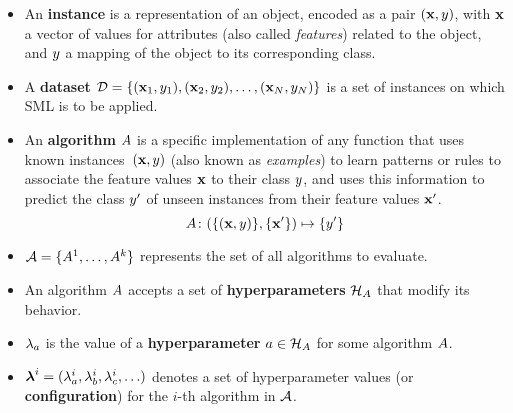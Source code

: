 	\begin{itemize}
		\item
		An {\bf instance} is a representation of an object, encoded as a pair $(\mathbf{x}, y)$,
		with $\mathbf{x}$ a vector of values for attributes (also called \emph{features}) related to
		the object, and $y$ a mapping of the object to its corresponding class.
		
		\item
		A {\bf dataset} $\mathcal{D} = \{(\mathbf{x}_1, y_1), (\mathbf{x}_2, y_2), \ldots,
		(\mathbf{x}_N, y_N)\}$ is a set of instances on which SML is to be applied.

		\item
		An {\bf algorithm} $A$ is a specific implementation of any function that uses known
		instances~$(\mathbf{x}, y)$ (also known as \emph{examples}) to learn patterns or rules to
		associate the feature values $\mathbf{x}$ to their class $y$, and uses this
		information to predict the class $y'$ of unseen instances from their feature values
		$\mathbf{x}'$.
		\begin{equation}
			\label{eq:sml_alg}
			A \colon (\{(\mathbf{x}, y)\}, \{\mathbf{x}'\}) \mapsto \{y'\}
		\end{equation}

		\item
		$\mathcal{A} = \{A^1, \ldots, A^k\}$ represents the set of all algorithms to evaluate.
		
		\item
		An algorithm $A$ accepts a set of {\bf hyperparameters} $\mathcal{H}_A$ that modify
		its behavior.

		\item
		$\lambda_a$ is the value of a {\bf hyperparameter} $a \in \mathcal{H}_A$ for some
		algorithm $A$.

		\item
		$\boldsymbol{\lambda}^i = (\lambda^i_a, \lambda^i_b, \lambda^i_c,\ldots)$ denotes a set of
		hyperparameter values (or {\bf configuration}) for the $i$-th algorithm in $\mathcal{A}$.
		

\end{itemize}
